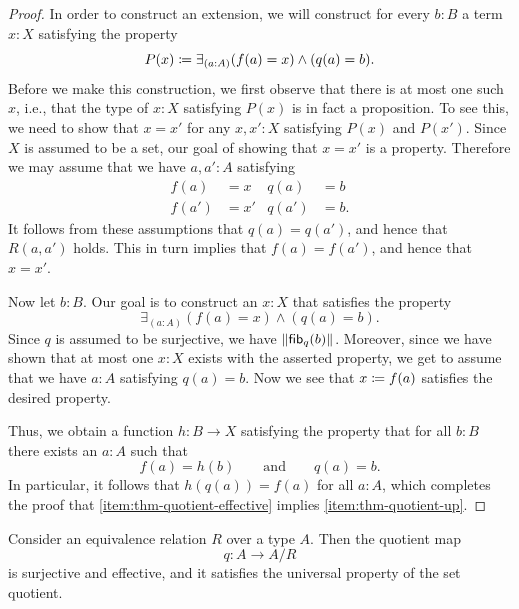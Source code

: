 \begin{proof}
  In order to construct an extension, we will construct for every $b:B$ a term $x:X$ satisfying the property
  \begin{equation*}
    P(x)\coloneqq \exists_{(a:A)}(f(a)=x)\land (q(a)=b).
  \end{equation*}
  Before we make this construction, we first observe that there is at most one such $x$, i.e., that the type of $x:X$ satisfying $P(x)$ is in fact a proposition. To see this, we need to show that $x=x'$ for any $x,x':X$ satisfying $P(x)$ and $P(x')$. Since $X$ is assumed to be a set, our goal of showing that $x=x'$ is a property. Therefore we may assume that we have $a,a':A$ satisfying
  \begin{align*}
    f(a) & = x & q(a) & = b \\
    f(a') & = x' & q(a') & = b.
  \end{align*}
  It follows from these assumptions that $q(a)=q(a')$, and hence that $R(a,a')$ holds. This in turn implies that $f(a)=f(a')$, and hence that $x=x'$.

  Now let $b:B$. Our goal is to construct an $x:X$ that satisfies the property
  \begin{equation*}
    \exists_{(a:A)}(f(a)=x)\land (q(a)=b).
  \end{equation*}
  Since $q$ is assumed to be surjective, we have $\Vert \mathsf{fib}_{q}(b)\Vert_{}$. Moreover, since we have shown that at most one $x:X$ exists with the asserted property, we get to assume that we have $a:A$ satisfying $q(a)=b$. Now we see that $x\coloneqq f(a)$ satisfies the desired property.

  Thus, we obtain a function $h:B\to X$ satisfying the property that for all $b:B$ there exists an $a:A$ such that
  \begin{equation*}
    f(a)=h(b)\qquad\text{and}\qquad q(a)=b.
  \end{equation*}
  In particular, it follows that $h(q(a))=f(a)$ for all $a:A$, which completes the proof that \ref{item:thm-quotient-effective} implies \ref{item:thm-quotient-up}.  
\end{proof}

\begin{cor}
  Consider an equivalence relation $R$ over a type $A$. Then the quotient map
  \begin{equation*}
    q:A\to A/R
  \end{equation*}
  is surjective and effective, and it satisfies the universal property of the set quotient.
\end{cor}

